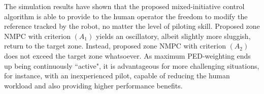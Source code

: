 The simulation results have shown that the proposed mixed-initiative control algorithm is able to provide to the human operator the freedom to modify the reference tracked by the robot, no matter the level of piloting skill. Proposed zone NMPC with criterion $(A_1)$ yields an oscillatory, albeit slightly more sluggish, return to the target zone. Instead, proposed zone NMPC with criterion $(A_2)$ does not exceed the target zone whatsoever. As maximum PED-weighting ends up being continuously ``active", it is advantageous for more challenging situations, for instance, with an inexperienced pilot, capable of reducing the human workload and also providing higher performance benefits.


